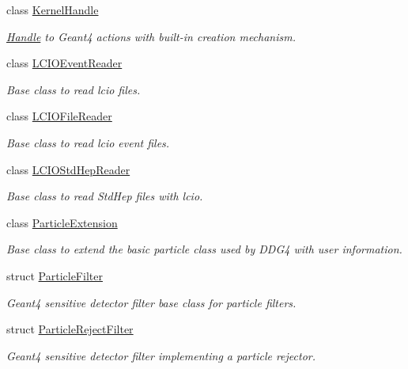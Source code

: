 \begin{DoxyCompactItemize}
class \hyperlink{class_d_d4hep_1_1_simulation_1_1_kernel_handle}{Kernel\+Handle}
\begin{DoxyCompactList}\small\item\em \hyperlink{class_d_d4hep_1_1_handle}{Handle} to Geant4 actions with built-\/in creation mechanism. \end{DoxyCompactList}\item 
class \hyperlink{class_d_d4hep_1_1_simulation_1_1_l_c_i_o_event_reader}{L\+C\+I\+O\+Event\+Reader}
\begin{DoxyCompactList}\small\item\em Base class to read lcio files. \end{DoxyCompactList}\item 
class \hyperlink{class_d_d4hep_1_1_simulation_1_1_l_c_i_o_file_reader}{L\+C\+I\+O\+File\+Reader}
\begin{DoxyCompactList}\small\item\em Base class to read lcio event files. \end{DoxyCompactList}\item 
class \hyperlink{class_d_d4hep_1_1_simulation_1_1_l_c_i_o_std_hep_reader}{L\+C\+I\+O\+Std\+Hep\+Reader}
\begin{DoxyCompactList}\small\item\em Base class to read Std\+Hep files with lcio. \end{DoxyCompactList}\item 
class \hyperlink{class_d_d4hep_1_1_simulation_1_1_particle_extension}{Particle\+Extension}
\begin{DoxyCompactList}\small\item\em Base class to extend the basic particle class used by D\+D\+G4 with user information. \end{DoxyCompactList}\item 
struct \hyperlink{struct_d_d4hep_1_1_simulation_1_1_particle_filter}{Particle\+Filter}
\begin{DoxyCompactList}\small\item\em Geant4 sensitive detector filter base class for particle filters. \end{DoxyCompactList}\item 
struct \hyperlink{struct_d_d4hep_1_1_simulation_1_1_particle_reject_filter}{Particle\+Reject\+Filter}
\begin{DoxyCompactList}\small\item\em Geant4 sensitive detector filter implementing a particle rejector. \end{DoxyCompactList}\item 

\end{DoxyCompactItemize}
